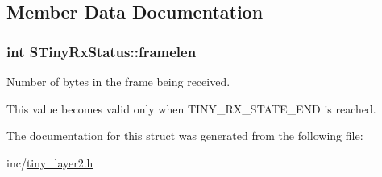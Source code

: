 \subsection{Member Data Documentation}
\hypertarget{structSTinyRxStatus_ad9f6055b8e74f10894c48ff2247f51c4}{}
\subsubsection[{framelen}]{\setlength{\rightskip}{0pt plus 5cm}int S\+Tiny\+Rx\+Status\+::framelen}\label{structSTinyRxStatus_ad9f6055b8e74f10894c48ff2247f51c4}


Number of bytes in the frame being received. 

This value becomes valid only when T\+I\+N\+Y\+\_\+\+R\+X\+\_\+\+S\+T\+A\+T\+E\+\_\+\+E\+N\+D is reached. 

The documentation for this struct was generated from the following file\+:\begin{DoxyCompactItemize}
\item 
inc/\hyperlink{tiny__layer2_8h}{tiny\+\_\+layer2.\+h}\end{DoxyCompactItemize}
